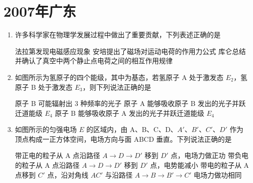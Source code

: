 \documentclass[\gkver]{gaokaozhenti}
\begin{document}
\chapter{2007年广东}

\begin{enumerate}
\item
许多科学家在物理学发展过程中做出了重要贡献，下列表述正确的是

{法拉第发现电磁感应现象}
{安培提出了磁场对运动电荷的作用力公式}
{库仑总结并确认了真空中两个静止点电荷之间的相互作用规律}


\item
如图所示为氢原子的四个能级，其中为基态，若氢原子 A 处于激发态 $E_{2}$，氢原子 B 处于激发态 $E_{3}$，则下列说法正确的是


{原子 B 可能辐射出 3 种频率的光子}
{原子 A 能够吸收原子 B 发出的光子并跃迁道能级 $E_{4}$}
{原子 B 能够吸收原子 A 发出的光子并跃迁道能级 $E_{4}$}


\item
如图所示的匀强电场 $E$ 的区域内，由 A、B、C、D、$A'$、$B'$、$C'$、$D'$ 作为顶点构成一正方体空间，电场方向与面 ABCD 垂直。下列说法正确的是


{带正电的粒子从 A 点沿路径 $A\to D\to D'$ 移到 $D'$ 点，电场力做正功}
{带负电的粒子从 A 点沿路径 $A\to D\to D'$ 移到 $D'$ 点，电势能减小}
{带电的粒子从 A 点移到 $C'$ 点，沿对角线 $AC'$ 与沿路径 $A\to B\to B'\to C'$ 电场力做功相同}


\end{enumerate}
\end{document}
